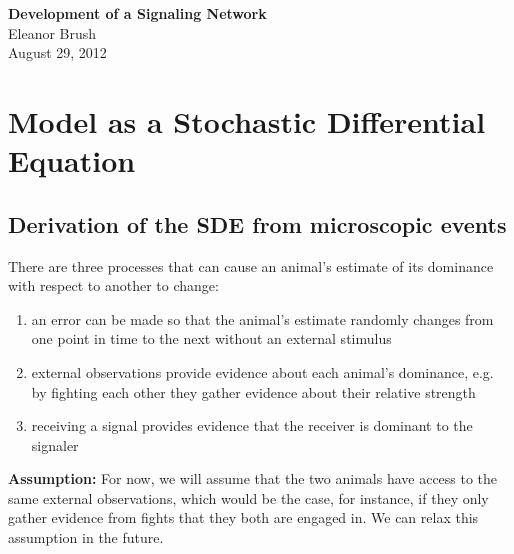 \documentclass{article}
\begin{document}
\begin{center}
\Large

\end{center}


\vspace{0pt}

\begin{center}
{\bf \LARGE{Development of a Signaling Network}}
\vspace{10pt}
\\ Eleanor Brush
\\ August 29, 2012
\end{center}


\vspace{0pt}
\normalsize
\section{Model as a Stochastic Differential Equation}

\subsection{Derivation of the SDE from microscopic events }
There are three processes that can cause an animal's estimate of its dominance with respect to another to change:
\begin{enumerate}
\item an error can be made so that the animal's estimate randomly changes from one point in time to the next without an external stimulus

\item external observations provide evidence about each animal's dominance, e.g. by fighting each other they gather evidence about their relative strength

\item receiving a signal provides evidence that the receiver is dominant to the signaler

\end{enumerate}
{\bf Assumption:} For now, we will assume that the two animals have access to the same external observations, which would be the case, for instance, if they only gather evidence from fights that they both are engaged in.  We can relax this assumption in the future.
\end{document}
